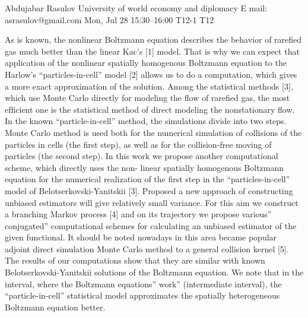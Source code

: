 \begin{talk}
  {Abdujabar Rasulov}%
  {University of world economy and diplomacy}%
  {E mail: asrasulov@gmail.com}%
  {}%
  {}%
  {}%
  {Mon, Jul 28 15:30–16:00}%
  {T12-1}%
  {T12}%
 {}%

				
			
As is known, the nonlinear Boltzmann equation describes the behavior of rareﬁed gas much better than the linear Kac’s [1] model. That is why we can expect that application of the nonlinear spatially homogenous Boltzmann equation to the Harlow’s “particles-in-cell” model [2] allows us to do a computation, which gives a more exact approximation of the solution. 
Among the statistical methods [3], which use Monte Carlo directly for modeling the ﬂow of rareﬁed gas, the most efﬁcient one is the statistical method of direct modeling the nonstationary ﬂow. 
In the known “particle-in-cell” method, the simulations divide into two steps. Monte Carlo method is used both for the numerical simulation of collisions of the particles in cells (the ﬁrst step), as well as for the collision-free moving of particles (the second step). 
In this work we propose another computational scheme, which directly uses the non- linear spatially homogenous Boltzmann equation for the numerical realization of the ﬁrst step in the “particles-in-cell” model of Belotserkovski-Yanitskii [3]. Proposed a new approach of constructing unbiased estimators will give relatively small variance.
 For this aim we construct a branching Markov process [4] and on its trajectory we propose various” conjugated” computational schemes for calculating an unbiased estimator of the given functional. It should be noted nowadays in this area became popular adjoint direct simulation Monte Carlo method to a general collision kernel [5].  
The results of our computations show that they are similar with known Belotserkovski-Yanitskii solutions of the Boltzmann equation. We note that in the interval, where the Boltzmann equations” work” (intermediate interval), the “particle-in-cell” statistical model approximates the spatially heterogeneous Boltzmann equation better. 

\medskip


\end{talk}
